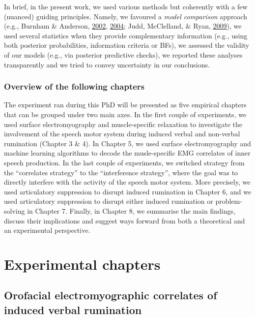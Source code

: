 \documentclass[a4paper,12pt,twoside,openright,oldfontcommands]{memoir}
\begin{document}
In brief, in the present work, we used various methods but coherently
with a few (nuanced) guiding principles. Namely, we favoured a
\emph{model comparison} approach (e.g., Burnham \& Anderson,
\protect\hyperlink{ref-burnham_model_2002}{2002},
\protect\hyperlink{ref-burnham_multimodel_2004}{2004}; Judd, McClelland,
\& Ryan, \protect\hyperlink{ref-judd_data_2009}{2009}), we used several
statistics when they provide complementary information (e.g., using both
posterior probabilities, information criteria or BFs), we assessed the
validity of our models (e.g., via posterior predictive checks), we
reported these analyses transparently and we tried to convey uncertainty
in our conclusions.

\section{Overview of the following
chapters}\label{overview-of-the-following-chapters}

The experiment ran during this PhD will be presented as five empirical
chapters that can be grouped under two main axes. In the first couple of
experiments, we used surface electromyography and muscle-specific
relaxation to investigate the involvement of the speech motor system
during induced verbal and non-verbal rumination (Chapter 3 \& 4). In
Chapter 5, we used surface electromyography and machine learning
algorithms to decode the musle-specific EMG correlates of inner speech
production. In the last couple of experiments, we switched strategy from
the ``correlates strategy'' to the ``interference strategy'', where the
goal was to directly interfere with the activity of the speech motor
system. More precisely, we used articulatory suppression to disrupt
induced rumination in Chapter 6, and we used articulatory suppression to
disrupt either induced rumination or problem-solving in Chapter 7.
Finally, in Chapter 8, we summarise the main findings, discuss their
implications and suggest ways forward from both a theoretical and an
experimental perspective.

\part{Experimental
chapters}\label{part-experimental-chapters}

\chapter{Orofacial electromyographic correlates of induced verbal
rumination}\label{orofacial-electromyographic-correlates-of-induced-verbal-rumination}
\end{document}

